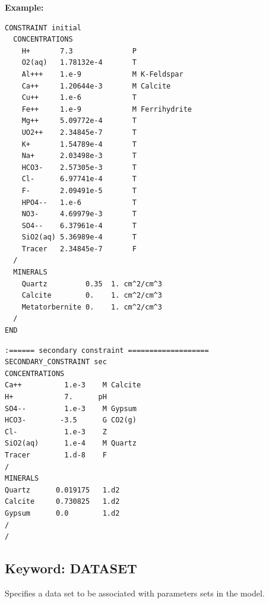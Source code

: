 \begin{mdframed}

\noindent
{\bf Example:}
\footnotesize
\begin{verbatim}
CONSTRAINT initial
  CONCENTRATIONS
    H+       7.3              P
    O2(aq)   1.78132e-4       T
    Al+++    1.e-9            M K-Feldspar
    Ca++     1.20644e-3       M Calcite
    Cu++     1.e-6            T
    Fe++     1.e-9            M Ferrihydrite
    Mg++     5.09772e-4       T
    UO2++    2.34845e-7       T
    K+       1.54789e-4       T
    Na+      2.03498e-3       T
    HCO3-    2.57305e-3       T
    Cl-      6.97741e-4       T
    F-       2.09491e-5       T
    HPO4--   1.e-6            T
    NO3-     4.69979e-3       T
    SO4--    6.37961e-4       T
    SiO2(aq) 5.36989e-4       T
    Tracer   2.34845e-7       F
  /
  MINERALS
    Quartz         0.35  1. cm^2/cm^3
    Calcite        0.    1. cm^2/cm^3
    Metatorbernite 0.    1. cm^2/cm^3
  /
END
\end{verbatim}
\normalsize
\end{mdframed}

\begin{mdframed}
\footnotesize
\begin{Verbatim}
:====== secondary constraint ===================
SECONDARY_CONSTRAINT sec
CONCENTRATIONS
Ca++          1.e-3    M Calcite
H+            7.      pH
SO4--         1.e-3    M Gypsum
HCO3-        -3.5      G CO2(g)
Cl-           1.e-3    Z
SiO2(aq)      1.e-4    M Quartz
Tracer        1.d-8    F
/
MINERALS
Quartz      0.019175   1.d2
Calcite     0.730825   1.d2
Gypsum      0.0        1.d2
/
/
\end{Verbatim}
\normalsize
\end{mdframed}


\hyperlink{target_key}{\return}


\newpage
\protect\hypertarget{target_datset}{}

\subsection{Keyword: DATASET}

\hfill\hyperlink{target_key}{\return}

Specifies a data set to be associated with parameters sets in the model.



